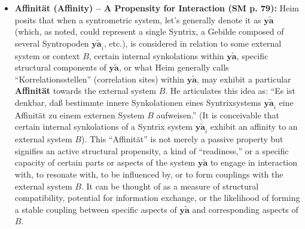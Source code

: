 \documentclass[12pt]{article}
\newcommand{\q}[1]{\enquote{#1}}
\newcommand{\syntrix}{\bm{y\widetilde{a}}}
\begin{document}
\begin{itemize}
    \item \textbf{Affinität (Affinity) – A Propensity for Interaction (SM p. 79):}
    Heim posits that when a syntrometric system, let's generally denote it as \( \mathbf{y\widetilde{a}} \) (which, as noted, could represent a single Syntrix, a Gebilde composed of several Syntropoden \( \syntrix_i \), etc.), is considered in relation to some external system or context \( B \), certain internal synkolations within \( \mathbf{y\widetilde{a}} \), specific structural components of \( \mathbf{y\widetilde{a}} \), or what Heim generally calls \q{Korrelationsstellen} (correlation sites) within \( \mathbf{y\widetilde{a}} \), may exhibit a particular \textbf{Affinität} towards the external system \( B \). He articulates this idea as: \q{Es ist denkbar, daß bestimmte innere Synkolationen eines Syntrixsystems \( \mathbf{y\widetilde{a}}_i \) eine Affinität zu einem externen System \( B \) aufweisen.} (It is conceivable that certain internal synkolations of a Syntrix system \( \mathbf{y\widetilde{a}}_i \) exhibit an affinity to an external system \( B \)).
    This \q{Affinität} is not merely a passive property but signifies an active structural propensity, a kind of \q{readiness,} or a specific capacity of certain parts or aspects of the system \( \mathbf{y\widetilde{a}} \) to engage in interaction with, to resonate with, to be influenced by, or to form couplings with the external system \( B \). It can be thought of as a measure of structural compatibility, potential for information exchange, or the likelihood of forming a stable coupling between specific aspects of \( \mathbf{y\widetilde{a}} \) and corresponding aspects of \( B \).


\end{itemize}
\end{document}
